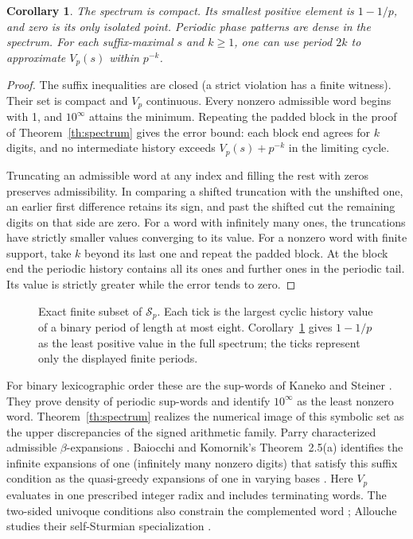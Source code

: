 \documentclass[11pt]{article}
\newtheorem{corollary}[theorem]{Corollary}
\begin{document}
\begin{corollary}\label{cor:symbol}
The spectrum is compact. Its smallest positive element is \(1-1/p\), and zero is its only isolated point. Periodic phase patterns are dense in the spectrum. For each suffix-maximal \(s\) and \(k\ge1\), one can use period \(2k\) to approximate \(V_p(s)\) within \(p^{-k}\).
\end{corollary}
\begin{proof}
The suffix inequalities are closed (a strict violation has a finite witness). Their set is compact and \(V_p\) continuous. Every nonzero admissible word begins with 1, and \(10^\infty\) attains the minimum. Repeating the padded block in the proof of Theorem~\ref{th:spectrum} gives the error bound: each block end agrees for \(k\) digits, and no intermediate history exceeds \(V_p(s)+p^{-k}\) in the limiting cycle.

Truncating an admissible word at any index and filling the rest with zeros preserves admissibility. In comparing a shifted truncation with the unshifted one, an earlier first difference retains its sign, and past the shifted cut the remaining digits on that side are zero. For a word with infinitely many ones, the truncations have strictly smaller values converging to its value. For a nonzero word with finite support, take \(k\) beyond its last one and repeat the padded block. At the block end the periodic history contains all its ones and further ones in the periodic tail. Its value is strictly greater while the error tends to zero.
\end{proof}

\begin{figure}[htbp]\centering

\caption{Exact finite subset of \(\mathcal S_p\). Each tick is the largest cyclic history value of a binary period of length at most eight. Corollary~\ref{cor:symbol} gives \(1-1/p\) as the least positive value in the full spectrum; the ticks represent only the displayed finite periods.}\label{fig:spectrum}
\end{figure}

For binary lexicographic order these are the sup-words of Kaneko and Steiner \cite[Theorem~1 and \S4.1]{kanekosteiner}. They prove density of periodic sup-words and identify \(10^\infty\) as the least nonzero word. Theorem~\ref{th:spectrum} realizes the numerical image of this symbolic set as the upper discrepancies of the signed arithmetic family. Parry characterized admissible \(\beta\)-expansions \cite{parry}. Baiocchi and Komornik's Theorem~2.5(a) identifies the infinite expansions of one (infinitely many nonzero digits) that satisfy this suffix condition as the quasi-greedy expansions of one in varying bases \cite{bk}. Here \(V_p\) evaluates in one prescribed integer radix and includes terminating words. The two-sided univoque conditions also constrain the complemented word \cite{devries}; Allouche studies their self-Sturmian specialization \cite{allouche}.
\end{document}
